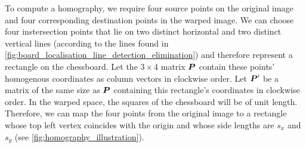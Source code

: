 \documentclass[../main.tex]{subfiles}
\begin{document}
To compute a homography, we require four source points on the original image and four corresponding destination points in the warped image.
We can choose four instersection points that lie on two distinct horizontal and two distinct vertical lines (according to the lines found in \cref{fig:board_localisation_line_detection_elimination}) and therefore represent a rectangle on the chessboard.
Let the $3 \times 4$ matrix ${\bm{P}}$ contain these points' homogenous coordinates as column vectors in clockwise order.
Let ${\bm{P}}'$ be a matrix of the same size as ${\bm{P}}$ containing this rectangle's coordinates in clockwise order.
In the warped space, the squares of the chessboard will be of unit length. 
Therefore, we can map the four points from the original image to a rectangle whose top left vertex coincides with the origin and whose side lengths are $s_x$ and $s_y$ (see \cref{fig:homography_illustration}).
\end{document}
